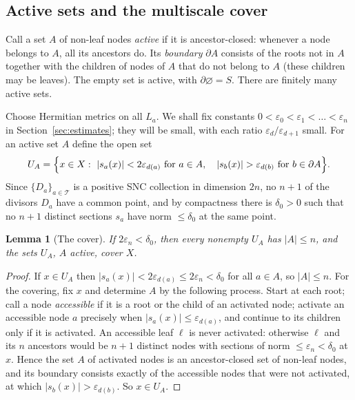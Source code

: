 \documentclass[12pt]{article}
\newtheorem{lemma}[theorem]{Lemma}
\theoremstyle{remark}
\newcommand{\eps}{\varepsilon}
\newcommand{\cT}{\mathcal T}
\begin{document}
\subsection*{Active sets and the multiscale cover}
Call a set $A$ of non-leaf nodes \emph{active} if it is
ancestor-closed: whenever a node belongs to $A$, all its ancestors do.
Its \emph{boundary} $\partial A$ consists of the roots not in $A$
together with the children of nodes of $A$ that do not belong to $A$
(these children may be leaves). The empty set is active, with
$\partial\varnothing=S$. There are finitely many active sets.

Choose Hermitian metrics on all $L_a$. We shall fix constants
$0<\eps_0<\eps_1<\dots<\eps_n$ in Section~\ref{sec:estimates}; they
will be small, with each ratio $\eps_d/\eps_{d+1}$ small. For an active
set $A$ define the open set
\begin{equation}\label{eq:UA}
 U_A=\Bigl\{x\in X:\
 |s_a(x)|<2\eps_{d(a)}\ \text{for }a\in A,\quad
 |s_b(x)|>\eps_{d(b)}\ \text{for }b\in\partial A\Bigr\}.
\end{equation}
Since $\{D_a\}_{a\in\cT}$ is a
positive SNC collection in dimension $2n$, no $n+1$ of the divisors
$D_a$ have a common point, and by compactness there is $\delta_0>0$
such that no $n+1$ distinct sections $s_a$ have norm $\le\delta_0$ at
the same point.

\begin{lemma}[The cover]\label{lem:cover}
If $2\eps_n<\delta_0$, then every nonempty $U_A$ has $|A|\le n$, and
the sets $U_A$, $A$ active, cover $X$.
\end{lemma}

\begin{proof}
If $x\in U_A$ then $|s_a(x)|<2\eps_{d(a)}\le2\eps_n<\delta_0$ for all
$a\in A$, so $|A|\le n$. For the covering, fix $x$ and determine $A$ by
the following process. Start at each root; call a node
\emph{accessible} if it is a root or the child of an activated node;
activate an accessible node $a$ precisely when $|s_a(x)|\le\eps_{d(a)}$,
and continue to its children only if it is activated. An accessible
leaf $\ell$ is never activated: otherwise $\ell$ and its $n$ ancestors
would be $n+1$ distinct nodes with sections of norm
$\le\eps_n<\delta_0$ at $x$. Hence the set $A$ of activated nodes is an
ancestor-closed set of non-leaf nodes, and its boundary consists
exactly of the accessible nodes that were not activated, at which
$|s_b(x)|>\eps_{d(b)}$. So $x\in U_A$.
\end{proof}
\end{document}
